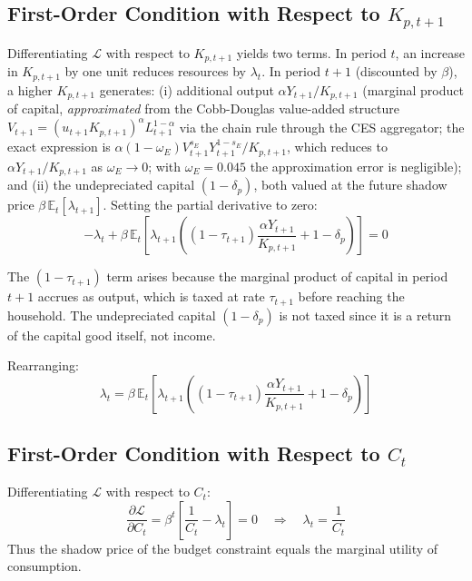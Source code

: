 \documentclass[12pt, a4paper]{article}
\begin{document}
\subsection*{First-Order Condition with Respect to $K_{p,t+1}$}

Differentiating $\mathcal{L}$ with respect to $K_{p,t+1}$ yields two terms. In period $t$, an increase in $K_{p,t+1}$ by one unit reduces resources by $\lambda_t$. In period $t+1$ (discounted by $\beta$), a higher $K_{p,t+1}$ generates: (i) additional output $\alpha Y_{t+1}/K_{p,t+1}$ (marginal product of capital, \textit{approximated} from the Cobb-Douglas value-added structure $V_{t+1} = (u_{t+1}K_{p,t+1})^\alpha L_{t+1}^{1-\alpha}$ via the chain rule through the CES aggregator; the exact expression is $\alpha(1-\omega_E)V_{t+1}^{s_E}Y_{t+1}^{1-s_E}/K_{p,t+1}$, which reduces to $\alpha Y_{t+1}/K_{p,t+1}$ as $\omega_E \to 0$; with $\omega_E = 0.045$ the approximation error is negligible); and (ii) the undepreciated capital $(1-\delta_p)$, both valued at the future shadow price $\beta\,\mathbb{E}_t[\lambda_{t+1}]$. Setting the partial derivative to zero:
\begin{equation*}
-\lambda_t + \beta\,\mathbb{E}_t\!\left[\lambda_{t+1}
\left((1-\tau_{t+1})\frac{\alpha Y_{t+1}}{K_{p,t+1}} + 1 - \delta_p\right)\right] = 0
\end{equation*}

The $(1-\tau_{t+1})$ term arises because the marginal product of capital in period $t+1$ accrues as output, which is taxed at rate $\tau_{t+1}$ before reaching the household. The undepreciated capital $(1-\delta_p)$ is not taxed since it is a return of the capital good itself, not income.

Rearranging:
\begin{equation*}
\lambda_t = \beta\,\mathbb{E}_t\!\left[\lambda_{t+1}
\left((1-\tau_{t+1})\frac{\alpha Y_{t+1}}{K_{p,t+1}} + 1 - \delta_p\right)\right]
\tag{A1}\label{eq:foc_k}
\end{equation*}

\subsection*{First-Order Condition with Respect to $C_t$}

Differentiating $\mathcal{L}$ with respect to $C_t$:
\begin{equation*}
\frac{\partial \mathcal{L}}{\partial C_t} = \beta^t\left[\frac{1}{C_t} - \lambda_t\right] = 0
\quad \Longrightarrow \quad
\lambda_t = \frac{1}{C_t}
\tag{A2}\label{eq:foc_c}
\end{equation*}
Thus the shadow price of the budget constraint equals the marginal utility of consumption.
\end{document}
